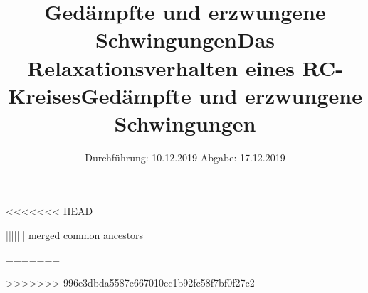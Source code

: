 

<<<<<<< HEAD
\subject{Versuch 354}
\title{Gedämpfte und erzwungene Schwingungen}
||||||| merged common ancestors
\subject{Versuch 353}
\title{Das Relaxationsverhalten eines RC-Kreises}
=======
\subject{Versuch 353}
\title{Gedämpfte und erzwungene Schwingungen}
>>>>>>> 996e3dbda5587e667010cc1b92fc58f7bf0f27c2
\date{%
  Durchführung: 10.12.2019
  \hspace{3em}
  Abgabe: 17.12.2019
}



\maketitle
\thispagestyle{empty}
\tableofcontents
\newpage






\nocite{*}
\printbibliography{}


